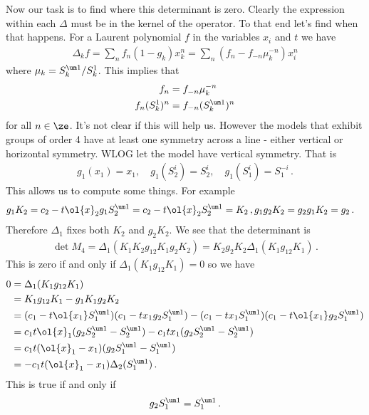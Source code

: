 Now our task is to find where this determinant is zero. Clearly the expression within each $\Delta$ must be in the kernel of the operator. To that end let's find when that happens. For a Laurent polynomial $f$ in the variables $x_i$ and $t$ we have
\begin{align}
	\Delta_k f = \sum_n f_n (1-g_k)x_k^n = \sum_n (f_n - f_{-n}\mu_k^{-n})x_i^n
\end{align}
where $\mu_k = S_k^{\um 1}/S_k^1$. This implies that
\begin{align}
	f_{n} &= f_{-n} \mu_k^{-n}\\
	f_{n} (S_k^1)^n &= f_{-n}(S_k^{\um 1})^n
\end{align}
for all $n \in \ze$. It's not clear if this will help us. However the models that exhibit groups of order 4 have at least one symmetry across a line - either vertical or horizontal symmetry. WLOG let the model have vertical symmetry. That is 
\begin{align}
	g_1(x_1) = x_1, \quad g_1(S_2^i) = S_2^i,\quad g_1(S_1^i) = S_1^{-i}\,.
\end{align}
This allows us to compute some things. For example
\begin{align}
	g_1 K_2 &= c_2 - t\ol{x}_2 g_1S_2^{\um 1} = c_2 - t\ol{x}_2 S_2^{\um 1} = K_2\,,
	g_1g_2K_2 = g_2 g_1 K_2 = g_2\,.
\end{align}
Therefore $\Delta_1$ fixes both $K_2$ and $g_2K_2$.
We see that the determinant is
\begin{align}
	\det M_4 = \Delta_1  (K_1K_2 g_{12}K_1 g_2K_2) = K_2 g_2K_2 \Delta_1  (K_1 g_{12}K_1)\,.
\end{align}
This is zero if and only if $\Delta_1  (K_1 g_{12}K_1) = 0$ so we have
\begin{align}\begin{split}
	0&=\Delta_1  (K_1 g_{12}K_1) \\
	&= K_1g_{12}K_1 - g_1 K_1 g_2 K_2 \\
	&= (c_1-t\ol{x_1}S_1^{\um 1})(c_1-tx_1g_2S_1^{\um 1})-(c_1-tx_1S_1^{\um 1})(c_1-t\ol{x_1}g_2S_1^{\um 1})\\
	&= c_1 t \ol{x}_1 (g_2 S_2^{\um 1} - S_2^{\um 1}) - c_1 t x_1 (g_2 S_2^{\um 1} - S_2^{\um 1})\\
	&= c_1 t (\ol{x}_1-x_1)(g_2 S_1^{\um 1}-S_1^{\um 1})\\
	& = -c_1 t(\ol{x}_1-x_1)\Delta_2(S_1^{\um 1})\,.
\end{split}\end{align}
This is true if and only if
\begin{align}
	g_2 S_1^{\um 1} = S_1^{\um 1}\,.
\end{align}
